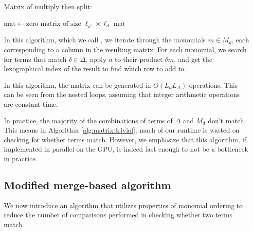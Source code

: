 \begin{algorithm}[H]
    \caption{Matrix of multiply then split: \triv}
    \label{alg:matrix:trivial}
    $\text{mat} \gets \text{zero matrix of size } \ell_{d^\prime} \times \ell_d $\;
    \Return mat
\end{algorithm}

In this algorithm, which we call \triv, we iterate through 
the monomials $m \in M_{d}$, each corresponding to a column in the
resulting matrix. For each monomial, we search for terms 
that match $\delta \in \Delta$, apply $u$ to their product $\delta m$, and 
get the lexographical index of the result to find which 
row to add to.

In this algorithm, the matrix can be generated in 
$O(L_{d}L_{\Delta})$ operations. 
This can be
seen from the nested loops, assuming that integer 
arithmetic operations are constant time.

In practice, the majority of the combinations of 
terms of $\Delta$ and $M_{d}$ don't match. This means in
Algorithm \ref{alg:matrix:trivial}, much of our 
runtime is wasted on checking for whether terms match.
However, we emphasize that this algorithm, if 
implemented in parallel on the GPU, is indeed
fast enough to not be a bottleneck in practice.

\subsection{Modified merge-based algorithm}

We now introduce an algorithm that utilizes 
properties of monomial ordering to reduce the 
number of comparisons 
performed in checking whether two terms match.


